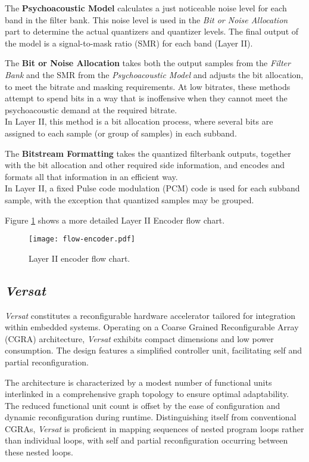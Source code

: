 The \textbf{Psychoacoustic Model} calculates a just noticeable noise level for each band in the filter bank. This noise level is used in the \textit{Bit or Noise Allocation} part to determine the actual quantizers and quantizer levels. 
The final output of the model is a signal-to-mask ratio (SMR) for each band (Layer II).

The \textbf{Bit or Noise Allocation} takes both the output samples from the \textit{Filter Bank} and the SMR from the \textit{Psychoacoustic Model} and adjusts the bit allocation, to meet the bitrate and masking requirements. At low bitrates, these methods attempt to spend bits in a way that is inoffensive when they cannot meet the psychoacoustic demand at the required bitrate.\\
In Layer II, this method is a bit allocation process, where several bits are assigned to each sample (or group of samples) in each subband.

The \textbf{Bitstream Formatting} takes the quantized filterbank outputs, together with the bit allocation and other required side information, and encodes and formats all that information in an efficient way.\\
In Layer II, a fixed Pulse code modulation (PCM) code is used for each subband sample, with the exception that quantized samples may be grouped.

Figure \ref{fig:flow-encoder} shows a more detailed Layer II Encoder flow chart.

\begin{figure}[H]
\centerline{\texttt{[image: flow-encoder.pdf]}}
\caption{Layer II encoder flow chart.}
\label{fig:flow-encoder}
\end{figure}


\subsection{\textit{Versat}}

\textit{Versat} constitutes a reconfigurable hardware accelerator tailored for integration within embedded systems. Operating on a Coarse Grained Reconfigurable Array (CGRA) architecture, \textit{Versat} exhibits compact dimensions and low power consumption. The design features a simplified controller unit, facilitating self and partial reconfiguration.

The architecture is characterized by a modest number of functional units interlinked in a comprehensive graph topology to ensure optimal adaptability. The reduced functional unit count is offset by the ease of configuration and dynamic reconfiguration during runtime. Distinguishing itself from conventional CGRAs, \textit{Versat} is proficient in mapping sequences of nested program loops rather than individual loops, with self and partial reconfiguration occurring between these nested loops.

